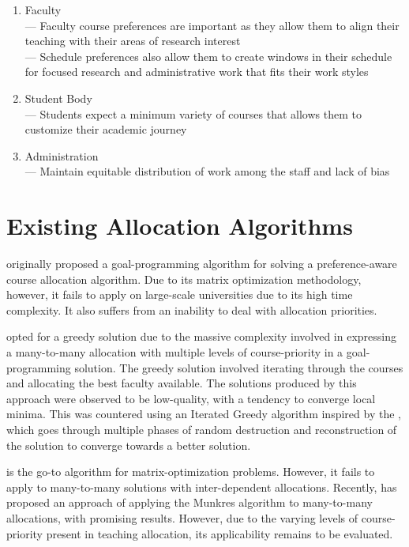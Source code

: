 \begin{enumerate}
\item Faculty\\
    — Faculty course preferences are important as they allow them to align their teaching with their areas of research interest\\
    — Schedule preferences also allow them to create windows in their schedule for focused research and administrative work that fits their work styles
\item Student Body\\
    — Students expect a minimum variety of courses that allows them to customize their academic journey
\item Administration\\
    — Maintain equitable distribution of work among the staff and lack of bias
\end{enumerate}

\section{Existing Allocation Algorithms}

\parencite{schniederjans1987goal} originally proposed a goal-programming algorithm for solving a preference-aware course allocation algorithm. Due to its matrix optimization methodology, however, it fails to apply on large-scale universities due to its high time complexity. It also suffers from an inability to deal with allocation priorities.

\parencite{rohan2017} opted for a greedy solution due to the massive complexity involved in expressing a many-to-many allocation with multiple levels of course-priority in a goal-programming solution. The greedy solution involved iterating through the courses and allocating the best faculty available. The solutions produced by this approach were observed to be low-quality, with a tendency to converge local minima. This was countered using an Iterated Greedy algorithm inspired by the \parencite{ruiz2007simple}, which goes through multiple phases of random destruction and reconstruction of the solution to converge towards a better solution.

\parencite{munkres1957algorithms} is the go-to algorithm for matrix-optimization problems. However, it fails to apply to many-to-many solutions with inter-dependent allocations. Recently, \parencite{zhu2016solving} has proposed an approach of applying the Munkres algorithm to many-to-many allocations, with promising results. However, due to the varying levels of course-priority present in teaching allocation, its applicability remains to be evaluated.

